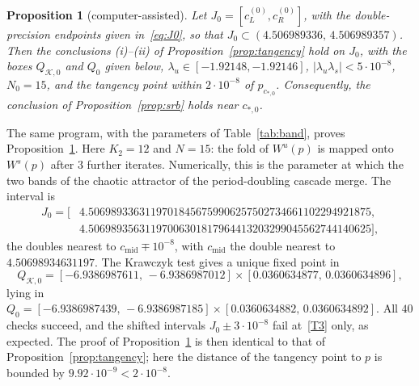 \documentclass[11pt]{amsart}
\newtheorem{proposition}[thm]{Proposition}
\theoremstyle{definition}
\theoremstyle{remark}
\newcommand{\Wu}{W^u}
\newcommand{\Ws}{W^s}
\newcommand{\cmid}{c_{\mathrm{mid}}}
\newcommand{\Kr}{\mathcal{K}}
\begin{document}
\begin{proposition}[computer-assisted]\label{prop:band}
Let $J_0=[c^{(0)}_L,c^{(0)}_R]$, with the double-precision endpoints given in~\eqref{eq:J0}, so that
$J_0\subset(4.506989336,\,4.506989357)$. Then the conclusions (i)--(ii) of
Proposition~\ref{prop:tangency} hold on $J_0$, with the boxes $Q_{\Kr,0}$ and $Q_0$ given below,
$\lambda_u\in[-1.92148,-1.92146]$, $|\lambda_u\lambda_s|<5\cdot10^{-8}$, $N_0=15$, and the tangency point within
$2\cdot10^{-8}$ of $p_{c_{*,0}}$. Consequently, the conclusion of Proposition~\ref{prop:srb} holds near
$c_{*,0}$.
\end{proposition}

The same program, with the parameters of Table~\ref{tab:band}, proves Proposition~\ref{prop:band}. Here $K_2=12$ and
$N=15$: the fold of $\Wu(p)$ is mapped onto $\Ws(p)$ after $3$ further iterates. Numerically, this is the
parameter at which the two bands of the chaotic attractor of the period-doubling cascade merge. The interval
is
\begin{equation}\label{eq:J0}
\begin{aligned}
J_0=[&4.50698933631197018456759906257502734661102294921875,\\
&4.50698935631197006301817964413203299045562744140625],
\end{aligned}
\end{equation}
the doubles nearest to $\cmid\mp10^{-8}$, with $\cmid$ the double nearest to $4.50698934631197$. The Krawczyk
test gives a unique fixed point in
\[
Q_{\Kr,0}=[-6.9386987611,\,-6.9386987012]\times[0.0360634877,\,0.0360634896],
\]
lying in $Q_0=[-6.9386987439,\,-6.9386987185]\times[0.0360634882,\,0.0360634892]$. All $40$ checks succeed,
and the shifted intervals $J_0\pm3\cdot10^{-8}$ fail at~\ref{T3} only, as expected. The proof of
Proposition~\ref{prop:band} is then identical to that of Proposition~\ref{prop:tangency}; here the distance of the tangency point
to $p$ is bounded by $9.92\cdot10^{-9}<2\cdot10^{-8}$.
\end{document}

